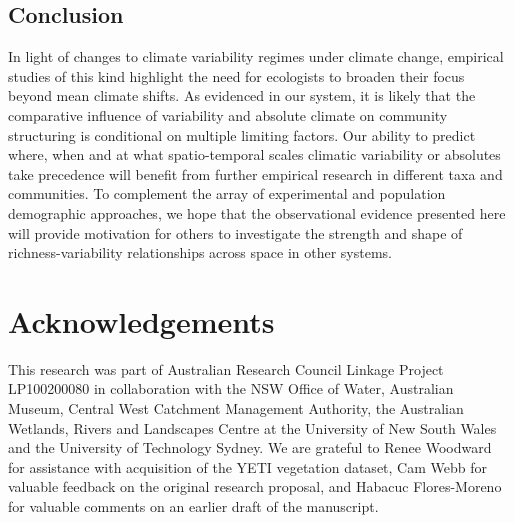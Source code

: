 \subsection{Conclusion}

In light of changes to climate variability regimes under climate change, empirical studies of this kind highlight the need for ecologists to broaden their focus beyond mean climate shifts. As evidenced in our system, it is likely that the comparative influence of variability and absolute climate on community structuring is conditional on multiple limiting factors. Our ability to predict where, when and at what spatio-temporal scales climatic variability or absolutes take precedence will benefit from further empirical research in different taxa and communities. To complement the array of experimental and population demographic approaches, we hope that the observational evidence presented here will provide motivation for others to investigate the strength and shape of richness-variability relationships across space in other systems.

\section*{Acknowledgements}

This research was part of Australian Research Council Linkage Project LP100200080 in collaboration with the NSW Office of Water, Australian Museum, Central West Catchment Management Authority, the Australian Wetlands, Rivers and Landscapes Centre at the University of New South Wales and the University of Technology Sydney. We are grateful to Renee Woodward for assistance with acquisition of the YETI vegetation dataset, Cam Webb for valuable feedback on the original research proposal, and Habacuc Flores-Moreno for valuable comments on an earlier draft of the manuscript.


\newpage
